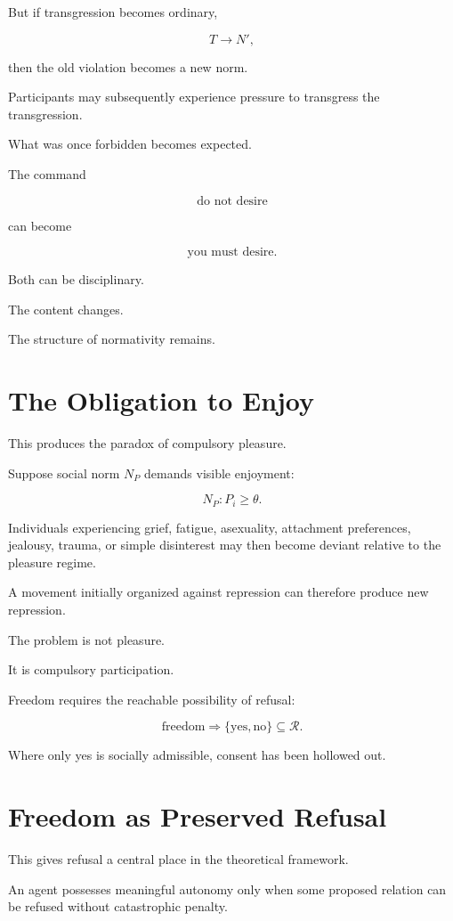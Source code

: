 \documentclass[11pt,oneside]{book}
\theoremstyle{definition}
\theoremstyle{remark}
\newcommand{\R}{\mathcal{R}}
\begin{document}
But if transgression becomes ordinary,

\[
T\rightarrow N',
\]

then the old violation becomes a new norm.

Participants may subsequently experience pressure to transgress the transgression.

What was once forbidden becomes expected.

The command

\[
\text{do not desire}
\]

can become

\[
\text{you must desire}.
\]

Both can be disciplinary.

The content changes.

The structure of normativity remains.

\section{The Obligation to Enjoy}

This produces the paradox of compulsory pleasure.

Suppose social norm \(N_P\) demands visible enjoyment:

\[
N_P:
P_i\geq\theta.
\]

Individuals experiencing grief, fatigue, asexuality, attachment preferences, jealousy, trauma, or simple disinterest may then become deviant relative to the pleasure regime.

A movement initially organized against repression can therefore produce new repression.

The problem is not pleasure.

It is compulsory participation.

Freedom requires the reachable possibility of refusal:

\[
\text{freedom}
\Rightarrow
\{\text{yes},\text{no}\}
\subseteq
\R.
\]

Where only yes is socially admissible, consent has been hollowed out.

\section{Freedom as Preserved Refusal}

This gives refusal a central place in the theoretical framework.

An agent possesses meaningful autonomy only when some proposed relation can be refused without catastrophic penalty.
\end{document}
